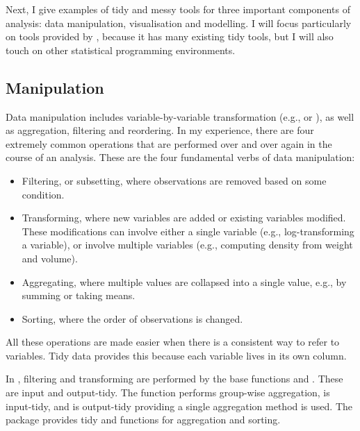 \documentclass[article]{jss}
\begin{document}
Next, I give examples of tidy and messy tools for three important components of analysis: data manipulation, visualisation and modelling. I will focus particularly on tools provided by  \citep{R}, because it has many existing tidy tools, but I will also touch on other statistical programming environments.

\subsection{Manipulation}

Data manipulation includes variable-by-variable transformation (e.g.,  or ), as well as aggregation, filtering and reordering. In my experience, there are four extremely common operations that are performed over and over again in the course of an analysis. These are the four fundamental verbs of data manipulation:

\begin{itemize}

  \item Filtering, or subsetting, where observations are removed based on some
  condition.

  \item Transforming, where new variables are added or existing variables
  modified. These modifications can involve either a single variable (e.g., 
  log-transforming a variable), or involve multiple variables (e.g., computing
  density from weight and volume).

  \item Aggregating, where multiple values are collapsed into a single value,
  e.g., by summing or taking means.

  \item Sorting, where the order of observations is changed.

\end{itemize}

All these operations are made easier when there is a consistent way to refer to variables. Tidy data provides this because each variable lives in its own column.

In , filtering and transforming are performed by the base  functions  and . These are input and output-tidy. The  function performs group-wise aggregation, is input-tidy, and is output-tidy providing a single aggregation method is used. The  package provides tidy  and  functions for aggregation and sorting.
\end{document}
